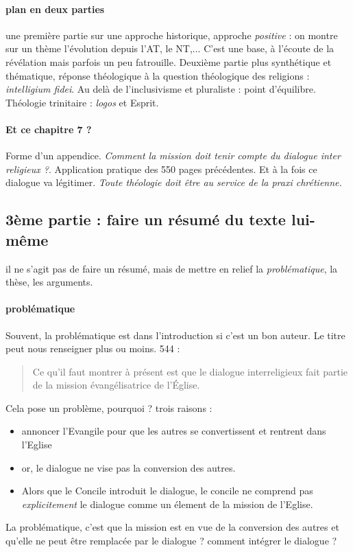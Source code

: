 \paragraph{plan en deux parties} une première partie sur une approche historique, approche \textit{positive} : on montre sur un thème l'évolution depuis l'AT, le NT,... C'est une base, à l'écoute de la révélation mais parfois un peu fatrouille. Deuxième partie plus synthétique et thématique, réponse théologique à la question théologique des religions : \textit{intelligium fidei}. Au delà de l'inclusivisme et pluraliste : point d'équilibre. Théologie trinitaire : \textit{logos} et Esprit. 

\paragraph{Et ce chapitre 7 ?} Forme d'un appendice. \textit{Comment la mission doit tenir compte du dialogue inter religieux ?}. Application pratique des 550 pages précédentes. Et à la fois ce dialogue va légitimer. \textit{Toute théologie doit être au service de la praxi chrétienne.}

\subsection{3ème partie : faire un résumé du texte lui-même} il ne s'agit pas de faire un résumé, mais de mettre en relief la \textit{problématique}, la thèse, les arguments.
\paragraph{problématique}
Souvent, la problématique est dans l'introduction si c'est un bon auteur. Le titre peut nous renseigner plus ou moins.
544 : \begin{quote}
    Ce qu'il faut montrer à présent est que le dialogue interreligieux
fait partie de la mission évangélisatrice de l'Église.
\end{quote}
Cela pose un problème, pourquoi ? 
trois raisons : 
\begin{itemize}
    \item annoncer l'Evangile pour que les autres se convertissent et rentrent dans l'Eglise
    \item or, le dialogue ne vise pas la conversion des autres.  
    \item Alors que le Concile introduit le dialogue, le concile ne comprend pas \textit{explicitement} le dialogue comme un élement de la mission de l'Eglise. 
\end{itemize}
La problématique, c'est que la mission est en vue de la conversion des autres et qu'elle ne peut être remplacée par le dialogue ? comment intégrer le dialogue ?

